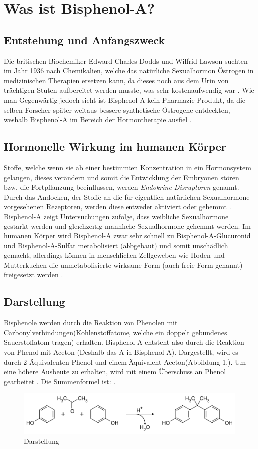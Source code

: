 \section{Was ist Bisphenol-A?}
\subsection{Entstehung und Anfangszweck}
Die britischen Biochemiker Edward Charles Dodds und Wilfrid Lawson suchten
im Jahr 1936 nach Chemikalien, welche das natürliche Sexualhormon Östrogen in medizinischen
Therapien ersetzen kann, da dieses noch aus dem Urin von trächtigen Stuten
aufbereitet werden musste, was sehr kostenaufwendig war \cite[]{Umweltbundesamt2010}.
Wie man Gegenwärtig jedoch sieht ist Bisphenol-A kein Pharmazie-Produkt, da die selben Forscher
später weitaus bessere synthetische Östrogene entdeckten, weshalb Bisphenol-A im Bereich
der Hormontherapie ausfiel \cite{Wikipedia}.
\subsection{Hormonelle Wirkung im humanen Körper}
Stoffe, welche wenn sie ab einer bestimmten Konzentration in ein Hormonsystem gelangen,
dieses verändern und somit die Entwicklung der Embryonen stören bzw. die Fortpflanzung
beeinflussen, werden \textit{Endokrine Disruptoren} genannt.
Durch das Andocken, der Stoffe an die für eigentlich natürlichen Sexualhormone
vorgesehenen Rezeptoren, werden diese entweder aktiviert oder gehemmt \cite{Umweltbundesamt2010}.
Bisphenol-A zeigt Untersuchungen zufolge, dass weibliche Sexualhormone gestärkt werden und
gleichzeitig männliche Sexualhormone gehemmt werden.
Im humanen Körper wird Bisphenol-A zwar sehr schnell zu Bisphenol-A-Glucuronid und
Bisphenol-A-Sulfat metabolisiert $($abbgebaut$)$ und somit unschädlich gemacht, allerdings
können in menschlichen Zellgeweben wie Hoden und Mutterkuchen die unmetabolisierte wirksame
Form (auch freie Form genannt) freigesetzt werden \cite{Umweltbundesamt2010}.

\subsection{Darstellung}
Bisphenole werden durch die Reaktion von Phenolen mit Carbonylverbindungen(Kohlenstoffatome, welche ein doppelt gebundenes Sauerstoffatom tragen) erhalten. Bisphenol-A entsteht also durch die Reaktion von Phenol mit Aceton (Deshalb das \glqq A\grqq{} in Bisphenol-A). Dargestellt, wird es durch 2 Äquivalenten Phenol und einem Äquivalent Aceton(Abbildung 1.). Um eine höhere Ausbeute zu erhalten, wird mit einem Überschuss an Phenol gearbeitet \cite{Herstellung}. Die Summenformel ist: .\\
\begin{figure}[htpb]
    \centering
    \includegraphics[width=.75\textwidth]{Darstellung.png}
    \caption{Darstellung \cite{Wikipedia}}
\end{figure}
\newpage
